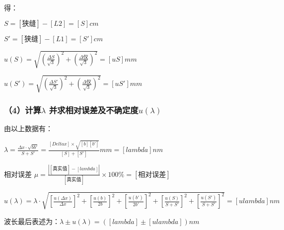 \documentclass[11pt,a4paper,oneside]{article}
\begin{document}
得：

$S = [狭缝] - [L2] = [S]cm$

$S' = [狭缝] - [L1] = [S']cm$

$u(S) = \sqrt{(\displaystyle\frac{\Delta S}{\sqrt{3}})^2+(\displaystyle\frac{\Delta 仪}{\sqrt{3}})^2} = [uS]mm$

$u(S') = \sqrt{(\displaystyle\frac{\Delta S'}{\sqrt{3}})^2+(\displaystyle\frac{\Delta 仪}{\sqrt{3}})^2} = [uS']mm$

\subsubsection{（4）计算$\lambda$ 并求相对误差及不确定度$u(\lambda )$}
由以上数据有：

$\lambda  = \displaystyle\frac{\Delta x\cdot \sqrt{bb'}}{S+S'} = \displaystyle\frac{[Delta x]\times \sqrt{[b][b']}}{[S]+[S']}mm = [lambda]nm$

相对误差 $\mu = \displaystyle\frac{\left | [真实值]-[lambda] \right |}{[真实值]} \times 100\% = [相对误差]$

$u(\lambda ) = \lambda \cdot \sqrt{\left [ \displaystyle\frac{u(\Delta x)}{\Delta x} \right ]^2+\left [ \displaystyle\frac{u(b)}{2b} \right ]^2+\left [ \displaystyle\frac{u(b')}{2b'} \right ]^2+\left [ \displaystyle\frac{u(S)}{S+S'} \right ]^2+\left [ \displaystyle\frac{u(S')}{S+S'} \right ]^2} = [ulambda]nm$

波长最后表述为：$\lambda \pm u(\lambda) = ([lambda]\pm [ulambda])nm$
\end{document}
